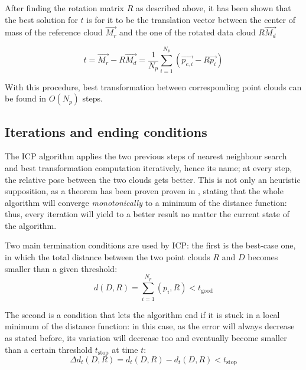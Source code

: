 After finding the rotation matrix $R$ as described above, it has been shown that the best solution for $t$
is for it to be the translation vector between the center of mass of the
reference cloud $\vec{M_{r}}$ and the one of the rotated
data cloud $R\vec{M_d}$ 

\begin{equation}
  t = \vec{M_r}-R\vec{M_d} =  \frac{1}{N_p}\sum_{i=1}^{N_p}\left(\vec{p_{c,i}}-R\vec{p_{i}}\right) 
\end{equation}

With this procedure, best transformation between corresponding point clouds can
be found in $O(N_p)$ steps.

\subsection{Iterations and ending conditions}
The ICP algorithm applies the two previous steps of nearest neighbour search and
best transformation computation iteratively, hence its name; at every step, the
relative pose between the two clouds gets better. This is not only an heuristic
supposition, as a theorem has been proven
proven in \cite{icp}, stating that the whole algorithm will converge
\emph{monotonically} to a minimum of the distance function: thus, every
iteration will yield to a better result no matter the current state of the
algorithm.

Two main termination conditions are used by ICP: the first is the best-case one,
in which the total distance between the two point clouds $R$ and $D$ becomes smaller than a
given threshold:
\begin{equation}
  d(D,R) = \sum_{i=1}^{N_p}\left(p_i,R\right) < t_{\text{good}}
\end{equation}

The second is a condition that lets the algorithm end if it is stuck in a local
minimum of the distance function: in this case, as the error will always
decrease as stated before, its variation will decrease too and eventually become
smaller than a certain threshold $t_{\text{stop}}$ at time $t$:
\begin{equation}
  \Delta d_t(D,R) = d_t(D,R)-d_t(D,R) < t_{\text{stop}}
\end{equation}

